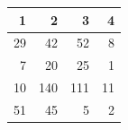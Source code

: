 \begin{tabular}{rrrr}
\toprule
1 & 2 & 3 & 4 \\
\midrule
29 & 42 & 52 & 8 \\
7 & 20 & 25 & 1 \\
10 & 140 & 111 & 11 \\
51 & 45 & 5 & 2 \\
\bottomrule
\end{tabular}
